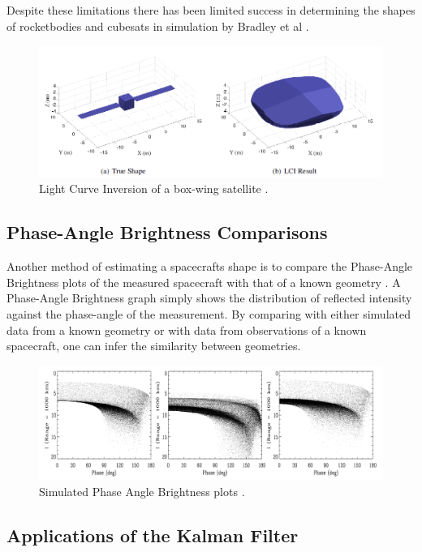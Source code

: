 \documentclass{article}
\begin{document}
Despite these limitations there has been limited success in determining the shapes of rocketbodies and cubesats in simulation by Bradley et al \cite{Bradley2014LIGHTCURVEIF}.

\begin{figure}[h]
	\centering
	\includegraphics[width=1\textwidth]{lci_LIGHTCURVE_INVERSION}
	\caption{Light Curve Inversion of a box-wing satellite \cite{Bradley2014LIGHTCURVEIF}.}
\end{figure}

\subsection{Phase-Angle Brightness Comparisons}

Another method of estimating a spacecrafts shape is to compare the Phase-Angle Brightness plots of the measured spacecraft with that of a known geometry \cite{Separating}. A Phase-Angle Brightness graph simply shows the distribution of reflected intensity against the phase-angle of the measurement. By comparing with either simulated data from a known geometry or with data from observations of a known spacecraft, one can infer the similarity between geometries.

\begin{figure}[h]
	\centering
	\includegraphics[width=\textwidth]{phase_angle_brightness_SEPARATING_ATTITUDE}
	\caption{Simulated Phase Angle Brightness plots \cite{Separating}.}
\end{figure}

\subsection{Applications of the Kalman Filter}
\end{document}
